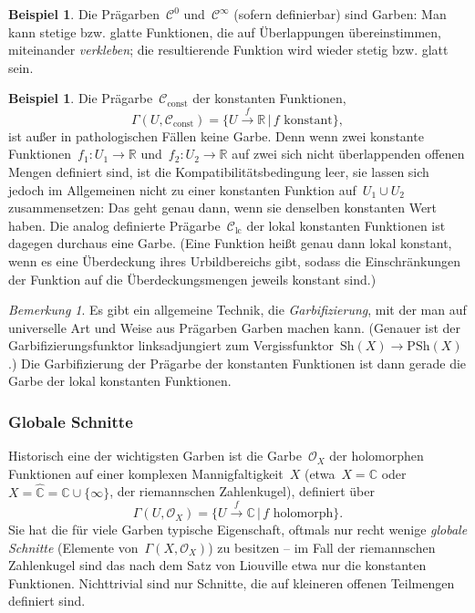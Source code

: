 \documentclass[a4paper,ngerman,12pt]{scrartcl}
\theoremstyle{definition}
\newtheorem{bsp}[defn]{Beispiel}
\theoremstyle{plain}
\theoremstyle{remark}
\newtheorem{bem}[defn]{Bemerkung}
\newcommand{\xra}[1]{\xrightarrow{#1}}
\newcommand{\RR}{\mathbb{R}}
\newcommand{\CC}{\mathbb{C}}
\newcommand{\C}{\mathcal{C}}
\renewcommand{\O}{\mathcal{O}}
\newcommand{\Sh}{\mathrm{Sh}}
\newcommand{\PSh}{\mathrm{PSh}}
\renewcommand{\_}{\mathpunct{.}\,}
\newcommand{\?}{\,{:}\,}
\begin{document}
\begin{bsp}Die Prägarben~$\C^0$ und~$\C^\infty$ (sofern definierbar) sind
Garben: Man kann stetige bzw. glatte Funktionen, die auf Überlappungen
übereinstimmen, miteinander \emph{verkleben}; die resultierende Funktion wird
wieder stetig bzw. glatt sein.\end{bsp}

\begin{bsp}Die Prägarbe~$\C_{\text{const}}$ der konstanten Funktionen,
\[ \Gamma(U, \C_{\text{const}}) = \{ U \xra{f} \RR \,|\, \text{$f$ konstant}
\}, \]
ist außer in pathologischen Fällen keine Garbe. Denn wenn zwei konstante
Funktionen~$f_1 : U_1 \to \RR$ und~$f_2 : U_2 \to \RR$ auf zwei sich nicht
überlappenden offenen Mengen definiert sind, ist die Kompatibilitätsbedingung
leer, sie lassen sich jedoch im Allgemeinen nicht zu einer konstanten Funktion
auf~$U_1 \cup U_2$ zusammensetzen: Das geht genau dann, wenn sie denselben
konstanten Wert haben. Die analog definierte Prägarbe~$\C_{\text{lc}}$ der
lokal konstanten Funktionen ist dagegen durchaus eine Garbe. (Eine Funktion heißt genau
dann lokal konstant, wenn es eine Überdeckung ihres Urbildbereichs gibt, sodass
die Einschränkungen der Funktion auf die Überdeckungsmengen jeweils konstant
sind.)\end{bsp}

\begin{bem}Es gibt ein allgemeine Technik, die \emph{Garbifizierung}, mit der
man auf universelle Art und Weise aus Prägarben Garben machen kann. (Genauer
ist der Garbifizierungsfunktor linksadjungiert zum Vergissfunktor~$\Sh(X) \to
\PSh(X)$.) Die Garbifizierung der Prägarbe der konstanten Funktionen ist dann
gerade die Garbe der lokal konstanten Funktionen.\end{bem}


\subsubsection*{Globale Schnitte}

Historisch eine der wichtigsten Garben ist die Garbe~$\O_X$ der holomorphen
Funktionen auf einer komplexen Mannigfaltigkeit~$X$ (etwa~$X = \CC$ oder~$X =
\widehat{\CC} = \CC \cup \{ \infty \}$, der riemannschen Zahlenkugel), definiert
über
\[ \Gamma(U, \O_X) = \{ U \xra{f} \CC \,|\, \text{$f$ holomorph} \}. \]
Sie hat die für viele Garben typische Eigenschaft, oftmals nur recht wenige
\emph{globale Schnitte} (Elemente von~$\Gamma(X,\O_X)$) zu besitzen -- im Fall
der riemannschen Zahlenkugel sind das nach dem Satz von Liouville etwa nur
die konstanten Funktionen. Nichttrivial sind nur Schnitte, die auf
kleineren offenen Teilmengen definiert sind.
\end{document}
